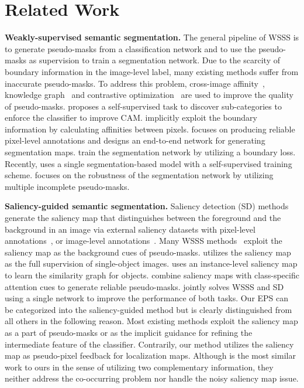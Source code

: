 \documentclass[final]{cvpr}
\begin{document}
\section{Related Work}


\noindent\textbf{Weakly-supervised semantic segmentation.}
The general pipeline of WSSS is to generate pseudo-masks from a classification network and to use the pseudo-masks as supervision to train a segmentation network. Due to the scarcity of boundary information in the image-level label, many existing methods suffer from inaccurate pseudo-masks. To address this problem, cross-image affinity~\cite{fan2020cian}, knowledge graph~\cite{liu2020leveraging} and contrastive optimization~\cite{sun2020mining, zhang2020splitting} are used to improve the quality of pseudo-masks. \cite{chang2020weakly} proposes a self-supervised task to discover sub-categories to enforce the classifier to improve CAM. \cite{ahn2019weakly, ahn2018learning} implicitly exploit the boundary information by calculating affinities between pixels. \cite{zhang2020reliability} focuses on producing reliable pixel-level annotations and designs an end-to-end network for generating segmentation maps. \cite{huang2018weakly, kolesnikov2016seed} train the segmentation network by utilizing a boundary loss. Recently, \cite{araslanov2020single} uses a single segmentation-based model with a self-supervised training scheme. \cite{fan2020employing} focuses on the robustness of the segmentation network by utilizing multiple incomplete pseudo-masks.



\vspace{1mm}
\noindent\textbf{Saliency-guided semantic segmentation.}
Saliency detection (SD) methods generate the saliency map that distinguishes between the foreground and the background in an image via external saliency datasets with pixel-level annotations~\cite{hou2017deeply, xiao2018deep, zhao2019pyramid}, or image-level annotations~\cite{wang2017learning}. Many WSSS methods~\cite{fan2020cian, huang2018weakly, lee2019ficklenet, li2018tell, wei2017object, wei2018revisiting} exploit the saliency map as the background cues of pseudo-masks. \cite{wei2016stc} utilizes the saliency map as the full supervision of single-object images. \cite{fan2018associating} uses an instance-level saliency map to learn the similarity graph for objects. \cite{chaudhry_dcsp_2017, wang2018weakly, yao2020saliency} combine saliency maps with class-specific attention cues to generate reliable pseudo-masks. \cite{zeng2019joint} jointly solves WSSS and SD using a single network to improve the performance of both tasks. Our EPS can be categorized into the saliency-guided method but is clearly distinguished from all others in the following reason. Most existing methods exploit the saliency map as a part of pseudo-masks or as the implicit guidance for refining the intermediate feature of the classifier. Contrarily, our method utilizes the saliency map as pseudo-pixel feedback for localization maps. Although \cite{zeng2019joint} is the most similar work to ours in the sense of utilizing two complementary information, they neither address the co-occurring problem nor handle the noisy saliency map issue.
 
\end{document}

